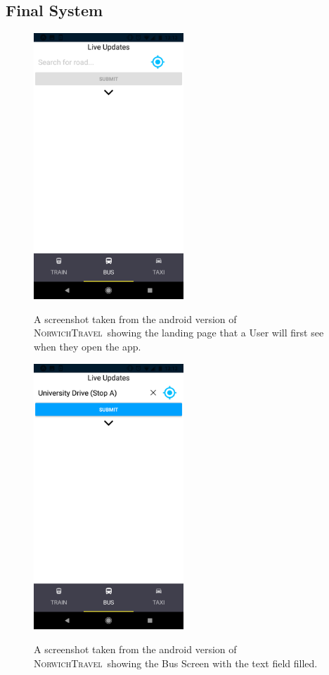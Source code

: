 \documentclass[cmpstyle]{ueacmpstyle}
\newcommand{\nt}{\textsc{NorwichTravel}}
\begin{document}
		\subsection{Final System} \label{app:final}
		\begin{figure}[h]
			\centering
			\includegraphics[height=10cm]{images/android-landing.png}\\
			\caption{A screenshot taken from the android version of \nt \ showing the landing page that a User will first see when they open the app.}\label{fig:android-landing}
		\end{figure}
		\begin{figure}[h]
			\centering
			\includegraphics[height=10cm]{images/android-bus-1.png}\\
			\caption{A screenshot taken from the android version of \nt \ showing the Bus Screen with the text field filled.}\label{fig:android-bus-1}
		\end{figure}
\end{document}
